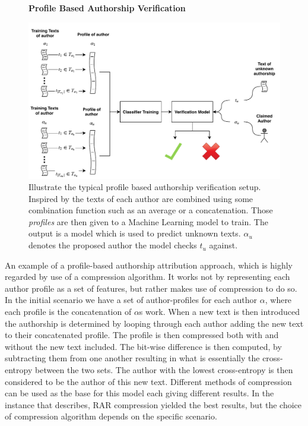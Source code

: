 \begin{figure}[htb]
    \centering
    \textbf{Profile Based Authorship Verification}\par\medskip
    \includegraphics[width=\textwidth]{./pictures/method/profile_based}
    \caption{Illustrate the typical profile based authorship verification setup.
    Inspired by \citet{stamatos2009} the texts of each author are combined using
    some combination function such as an average or a concatenation. Those
    \textit{profiles} are then given to a Machine Learning model to train. The
    output is a model which is used to predict unknown texts. $\alpha_u$ denotes
    the proposed author the model checks $t_u$ against.}
    \label{fig:profile_based}
\end{figure}

\noindent An example of a profile-based authorship attribution approach, which
is highly regarded by \citet{stamatos2009} use of a compression algorithm.
It works not by representing each author profile as a set of features, but
rather makes use of compression to do so. In the initial scenario we have
a set of author-profiles for each author $\alpha$, where each profile is
the concatenation of $\alpha$s work. When a new text is then introduced the
authorship is determined by looping through each author adding the new text to
their concatenated profile. The profile is then compressed both with and without
the new text included. The bit-wise difference is then computed, by subtracting
them from one another resulting in what is essentially the cross-entropy between
the two sets. The author with the lowest cross-entropy is then considered to
be the author of this new text. Different methods of compression can be used
as the base for this model each giving different results. In the instance that
\citet{stamatos2009} describes, RAR compression yielded the best results, but
the choice of compression algorithm depends on the specific scenario.

